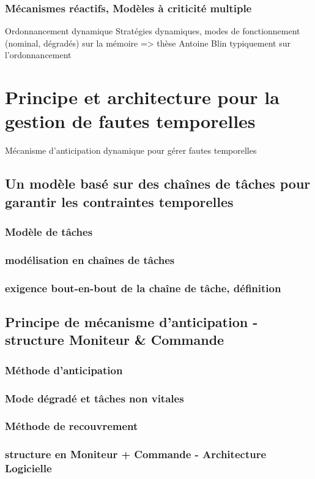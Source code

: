 \documentclass[french, a4paper, 11pt, twoside]{StyleThese}
\begin{document}
        \subsection{Mécanismes réactifs, Modèles à criticité multiple}
            Ordonnancement dynamique
            Stratégies dynamiques, modes de fonctionnement (nominal, dégradés)
                sur la mémoire => thèse Antoine Blin typiquement
                sur l'ordonnancement
\chapter{Principe et architecture pour la gestion de fautes temporelles}
    Mécanisme d'anticipation dynamique pour gérer fautes temporelles
    \section{Un modèle basé sur des chaînes de tâches pour garantir les contraintes temporelles}
        \subsection{Modèle de tâches}
        \subsection{modélisation en chaînes de tâches}
        \subsection{exigence bout-en-bout de la chaîne de tâche, définition}
    \section{Principe de mécanisme d'anticipation - structure Moniteur \& Commande}
        \subsection{Méthode d'anticipation}
        \subsection{Mode dégradé et tâches non vitales}
        \subsection{Méthode de recouvrement}
        \subsection{structure en Moniteur + Commande - Architecture Logicielle}
\end{document}
